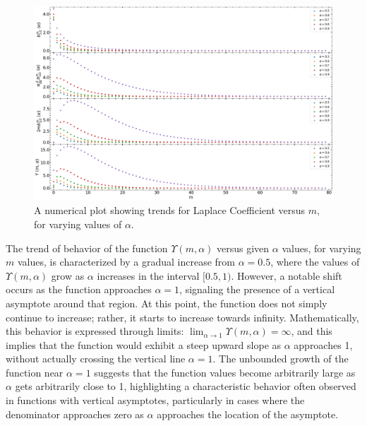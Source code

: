 \documentclass{article}
\begin{document}
\begin{figure}
    \centering
    \includegraphics[width=1\linewidth]{laplace_plot_A.png}
    \caption{A numerical plot showing trends for Laplace Coefficient versus $m$, for varying values of $\alpha$.}
    \label{fig:enter-label}
\end{figure}


The trend of behavior of the function $\Upsilon(m,\alpha)$ versus given $\alpha$ values, for varying $m$ values, is characterized by a gradual increase from $\alpha =0.5$, where the values of $\Upsilon(m,\alpha)$  grow as $\alpha$ increases in the interval \([0.5, 1)\). However, a notable shift occurs as the function approaches \(\alpha=1\), signaling the presence of a vertical asymptote around that region. At this point, the function does not simply continue to increase; rather, it starts to increase towards infinity. Mathematically, this behavior is expressed through limits: $\lim_{{\alpha \to 1}} \Upsilon(m,\alpha) = \infty$, and this implies that the function would exhibit a steep upward slope as $\alpha$ approaches 1, without actually crossing the vertical line $\alpha=1$. The unbounded growth of the function near $\alpha=1$ suggests that the function values become arbitrarily large as $\alpha$ gets arbitrarily close to 1, highlighting a characteristic behavior often observed in functions with vertical asymptotes, particularly in cases where the denominator approaches zero as $\alpha$ approaches the location of the asymptote. 
\end{document}
